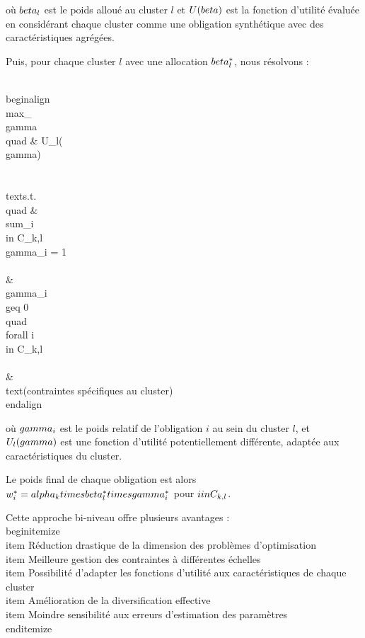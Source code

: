 où $\\beta_l$ est le poids alloué au cluster $l$ et $U(\\beta)$ est la fonction d'utilité évaluée en considérant chaque cluster comme une obligation synthétique avec des caractéristiques agrégées.

Puis, pour chaque cluster $l$ avec une allocation $\\beta_l^*$, nous résolvons :

\\begin{align}
\\max_{\\gamma} \\quad & U_l(\\gamma) \\\\
\\text{s.t.} \\quad & \\sum_{i \\in C_{k,l}} \\gamma_i = 1 \\\\
& \\gamma_i \\geq 0 \\quad \\forall i \\in C_{k,l} \\\\
& \\text{(contraintes spécifiques au cluster)}
\\end{align}

où $\\gamma_i$ est le poids relatif de l'obligation $i$ au sein du cluster $l$, et $U_l(\\gamma)$ est une fonction d'utilité potentiellement différente, adaptée aux caractéristiques du cluster.

Le poids final de chaque obligation est alors $w_i^* = \\alpha_k \\times \\beta_l^* \\times \\gamma_i^*$ pour $i \\in C_{k,l}$.

Cette approche bi-niveau offre plusieurs avantages :
\\begin{itemize}
    \\item Réduction drastique de la dimension des problèmes d'optimisation
    \\item Meilleure gestion des contraintes à différentes échelles
    \\item Possibilité d'adapter les fonctions d'utilité aux caractéristiques de chaque cluster
    \\item Amélioration de la diversification effective
    \\item Moindre sensibilité aux erreurs d'estimation des paramètres
\\end{itemize}

